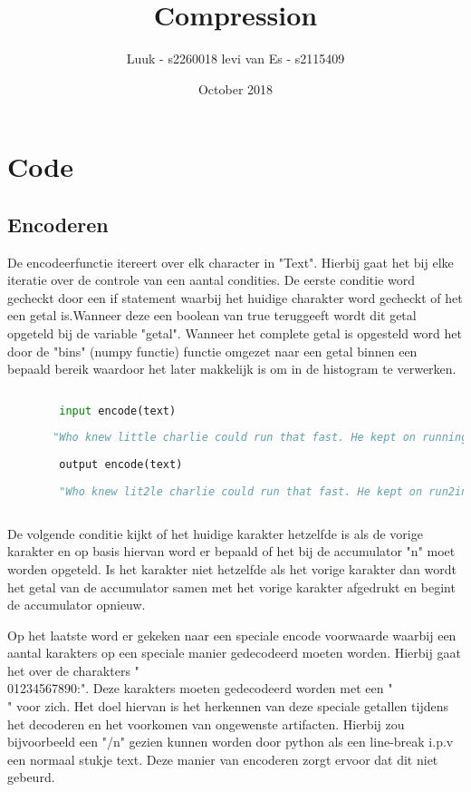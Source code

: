 \documentclass{article}
\title{Compression}
\author{Luuk - s2260018 levi van Es - s2115409 }
\date{October 2018}
\begin{document}
\maketitle

\section{Code}

    \subsection{Encoderen}
       De encodeerfunctie itereert over elk character in "Text". Hierbij gaat het bij elke iteratie over de controle van een aantal condities. De eerste conditie word gecheckt door een if statement waarbij het huidige charakter word gecheckt of het een getal is.Wanneer deze een boolean van true teruggeeft wordt dit getal opgeteld bij de variable "getal". Wanneer het complete getal is opgesteld word het door de "bins" (numpy functie) functie omgezet naar een getal binnen een bepaald bereik waardoor het later makkelijk is om in de histogram te verwerken.
       
       
       \begin{lstlisting}[frame=single, language=python]  % Start your code-block
        
        input encode(text)
        
       "Who knew little charlie could run that fast. He kept on running faster fasteer and fasteeeeeerr !"
        
        output encode(text) 
        
        "Who knew lit2le charlie could run that fast. He kept on run2ing faster faste2r and faste6r2 !"
 

        \end{lstlisting}

       
       De volgende conditie kijkt of het huidige karakter hetzelfde is als de vorige karakter en op basis hiervan word er bepaald of het bij de accumulator "n" moet worden opgeteld. Is het karakter niet hetzelfde als het vorige karakter dan wordt het getal van de accumulator samen met het vorige karakter afgedrukt en begint de accumulator opnieuw.
       \newline
       
       Op het laatste word er gekeken naar een speciale encode voorwaarde waarbij een aantal karakters op een speciale manier gedecodeerd moeten worden. Hierbij gaat het over de charakters "\\01234567890:". Deze karakters moeten gedecodeerd worden met een "\\" voor zich. Het doel hiervan is het herkennen van deze speciale getallen tijdens het decoderen en het voorkomen van ongewenste artifacten. Hierbij zou bijvoorbeeld een "/n" gezien kunnen worden door python als een line-break i.p.v een normaal stukje text. Deze manier van encoderen zorgt ervoor dat dit niet gebeurd.
       
\end{document}

